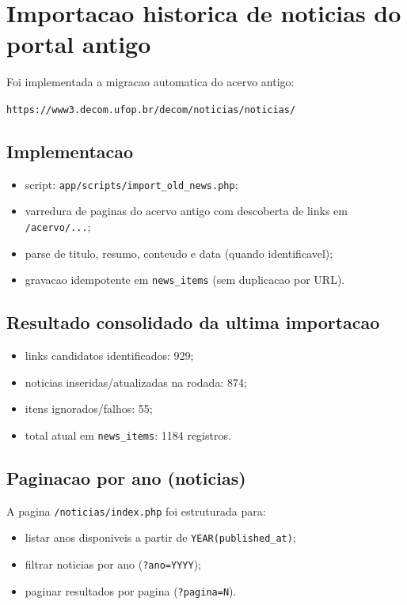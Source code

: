 \documentclass[12pt,a4paper]{article}
\begin{document}
\section{Importacao historica de noticias do portal antigo}
Foi implementada a migracao automatica do acervo antigo:
\begin{center}
\texttt{https://www3.decom.ufop.br/decom/noticias/noticias/}
\end{center}

\subsection{Implementacao}
\begin{itemize}
    \item script: \texttt{app/scripts/import\_old\_news.php};
    \item varredura de paginas do acervo antigo com descoberta de links em \texttt{/acervo/...};
    \item parse de titulo, resumo, conteudo e data (quando identificavel);
    \item gravacao idempotente em \texttt{news\_items} (sem duplicacao por URL).
\end{itemize}

\subsection{Resultado consolidado da ultima importacao}
\begin{itemize}
    \item links candidatos identificados: 929;
    \item noticias inseridas/atualizadas na rodada: 874;
    \item itens ignorados/falhos: 55;
    \item total atual em \texttt{news\_items}: 1184 registros.
\end{itemize}

\subsection{Paginacao por ano (noticias)}
A pagina \texttt{/noticias/index.php} foi estruturada para:
\begin{itemize}
    \item listar anos disponiveis a partir de \texttt{YEAR(published\_at)};
    \item filtrar noticias por ano (\texttt{?ano=YYYY});
    \item paginar resultados por pagina (\texttt{?pagina=N}).
\end{itemize}
\end{document}

